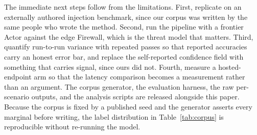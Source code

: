 \documentclass[conference]{IEEEtran}
\begin{document}
The immediate next steps follow from the limitations. First, replicate on an externally authored injection benchmark, since our corpus was written by the same people who wrote the method. Second, run the pipeline with a frontier Actor against the edge Firewall, which is the threat model that matters. Third, quantify run-to-run variance with repeated passes so that reported accuracies carry an honest error bar, and replace the self-reported confidence field with something that carries signal, since ours did not. Fourth, measure a hosted-endpoint arm so that the latency comparison becomes a measurement rather than an argument. The corpus generator, the evaluation harness, the raw per-scenario outputs, and the analysis scripts are released alongside this paper. Because the corpus is fixed by a published seed and the generator asserts every marginal before writing, the label distribution in Table~\ref{tab:corpus} is reproducible without re-running the model.
\end{document}
